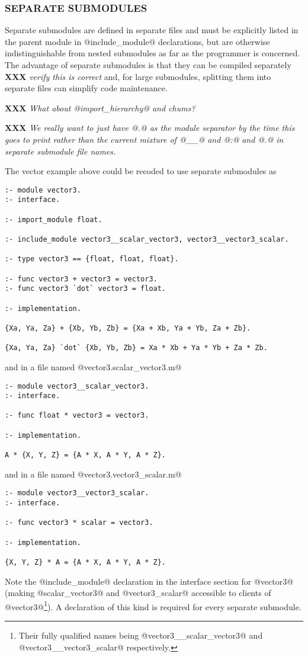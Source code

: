 \documentclass[a4paper,11pt,notitlepage,onecolumn]{article}
\newcommand{\XXX}[1]%
{{\small\textbf{XXX} \emph{#1}}}
\begin{document}
\subsubsection{SEPARATE SUBMODULES}

Separate submodules are defined in separate files and must be explicitly
listed in the parent module in @include_module@ declarations, but are 
otherwise indistinguishable from nested submodules as far as the
programmer is concerned.  The advantage of separate submodules is that
they can be compiled separately \XXX{verify this is correct} and, for
large submodules, splitting them into separate files can simplify code
maintenance.

\XXX{What about @import\_hierarchy@ and chums?}

\XXX{We really want to just have @.@ as the module separator by the time
this goes to print rather than the current mixture of @\_\_@ and @:@ and
@.@ in separate submodule file names.}

The vector example above could be recoded to use separate submodules as
\begin{verbatim}
:- module vector3.
:- interface.

:- import_module float.

:- include_module vector3__scalar_vector3, vector3__vector3_scalar.

:- type vector3 == {float, float, float}.

:- func vector3 + vector3 = vector3.
:- func vector3 `dot` vector3 = float.
    
:- implementation.

{Xa, Ya, Za} + {Xb, Yb, Zb} = {Xa + Xb, Ya + Yb, Za + Zb}.

{Xa, Ya, Za} `dot` {Xb, Yb, Zb} = Xa * Xb + Ya * Yb + Za * Zb.
\end{verbatim}
and in a file named @vector3.scalar_vector3.m@
\begin{verbatim}
:- module vector3__scalar_vector3.
:- interface.

:- func float * vector3 = vector3.

:- implementation.

A * {X, Y, Z} = {A * X, A * Y, A * Z}.
\end{verbatim}
and in a file named @vector3.vector3_scalar.m@
\begin{verbatim}
:- module vector3__vector3_scalar.
:- interface.

:- func vector3 * scalar = vector3.

:- implementation.

{X, Y, Z} * A = {A * X, A * Y, A * Z}.
\end{verbatim}
Note the @include_module@ declaration in the interface section for
@vector3@ (making @scalar_vector3@ and @vector3_scalar@ accessible to
clients of @vector3@\footnote{Their fully qualified names being
@vector3\_\_scalar\_vector3@ and @vector3\_\_vector3\_scalar@
respectively.}).  A declaration of this kind is required for every
separate submodule.
\end{document}
